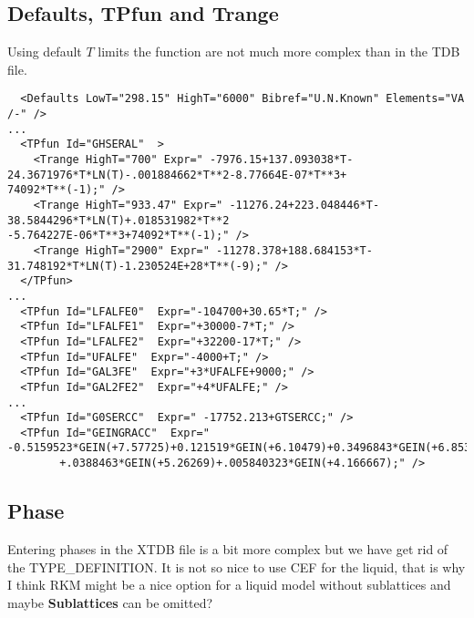 \documentclass{article}
\begin{document}
\begin{appendices}
\subsection{Defaults, TPfun and Trange}\label{sec:tpfuns}

Using default $T$ limits the function are not much more complex than
in the TDB file.

{\small
\begin{verbatim}
  <Defaults LowT="298.15" HighT="6000" Bibref="U.N.Known" Elements="VA /-" />
...
  <TPfun Id="GHSERAL"  >
    <Trange HighT="700" Expr=" -7976.15+137.093038*T-24.3671976*T*LN(T)-.001884662*T**2-8.77664E-07*T**3+
74092*T**(-1);" />
    <Trange HighT="933.47" Expr=" -11276.24+223.048446*T-38.5844296*T*LN(T)+.018531982*T**2
-5.764227E-06*T**3+74092*T**(-1);" />
    <Trange HighT="2900" Expr=" -11278.378+188.684153*T-31.748192*T*LN(T)-1.230524E+28*T**(-9);" />
  </TPfun>
...
  <TPfun Id="LFALFE0"  Expr="-104700+30.65*T;" />
  <TPfun Id="LFALFE1"  Expr="+30000-7*T;" />
  <TPfun Id="LFALFE2"  Expr="+32200-17*T;" />
  <TPfun Id="UFALFE"  Expr="-4000+T;" />
  <TPfun Id="GAL3FE"  Expr="+3*UFALFE+9000;" />
  <TPfun Id="GAL2FE2"  Expr="+4*UFALFE;" />
...
  <TPfun Id="G0SERCC"  Expr=" -17752.213+GTSERCC;" /> 
  <TPfun Id="GEINGRACC"  Expr=" -0.5159523*GEIN(+7.57725)+0.121519*GEIN(+6.10479)+0.3496843*GEIN(+6.8533)
        +.0388463*GEIN(+5.26269)+.005840323*GEIN(+4.166667);" /> 
\end{verbatim}
}

\subsection{Phase}\label{sec:phaseexample}

Entering phases in the XTDB file is a bit more complex but we have get
rid of the TYPE\_DEFINITION.  It is not so nice to use CEF for the
liquid, that is why I think RKM might be a nice option for a liquid
model without sublattices and maybe {\bf Sublattices} can be omitted?


\end{appendices}
\end{document}
